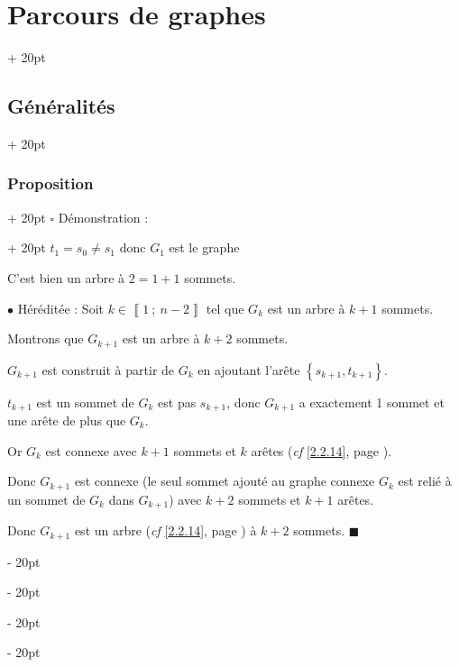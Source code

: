 \documentclass[a4paper, 12pt, twoside]{article}
\newcommand{\nset}[2]{\left\llbracket #1\ ;\ #2 \right\rrbracket}
\newcommand{\set}[1]{\left\{ #1 \right\}}
\newcommand{\ind}[1][20pt]{\advance\leftskip + #1}
\newcommand{\deind}[1][20pt]{\advance\leftskip - #1}
\newenvironment{indt}[2][20pt]{#2 \par \ind[#1]}{\par \deind} %
\begin{document}
\begin{indt}{\section{Parcours de graphes}}
\begin{indt}{\subsection{Généralités}}
\begin{indt}{\subsubsection{Proposition}}
\begin{indt}{$\square$ Démonstration :}
                    $t_1 = s_0 \neq s_1$ donc $G_1$ est le graphe 
                    \begin{center}
                    \end{center}

                    C'est bien un arbre à $2 = 1 + 1$ sommets.

                    \vspace{6pt}
                    
                    $\bullet$ Héréditée : Soit $k \in \nset 1 {n - 2}$ tel que $G_k$ est un arbre à $k + 1$ sommets.

                    Montrons que $G_{k + 1}$ est un arbre à $k + 2$ sommets.

                    $G_{k + 1}$ est construit à partir de $G_k$ en ajoutant l'arête $\set{s_{k + 1}, t_{k + 1}}$.

                    $t_{k + 1}$ est un sommet de $G_k$ est pas $s_{k + 1}$, donc $G_{k + 1}$ a exactement 1 sommet et une arête de plus que $G_k$.

                    Or $G_k$ est connexe avec $k + 1$ sommets et $k$ arêtes (\textit{cf} \ref{2.2.14}, page \pageref{2.2.14}).

                    Donc $G_{k + 1}$ est connexe (le seul sommet ajouté au graphe connexe $G_k$ est relié à un sommet de $G_k$ dans $G_{k + 1}$) avec $k + 2$ sommets et $k + 1$ arêtes.

                    Donc $G_{k + 1}$ est un arbre (\textit{cf} \ref{2.2.14}, page \pageref{2.2.14}) à $k + 2$ sommets. $\blacksquare$
                \end{indt}
            \end{indt}

            \vspace{12pt}
            

\end{indt}
\end{indt}
\end{document}
